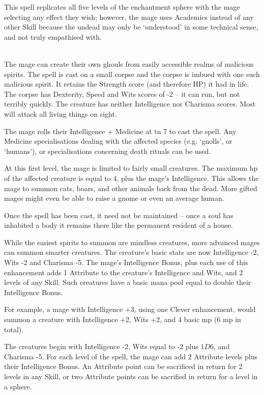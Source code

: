 \documentclass[titlepage,a4paper,openany]{book}
\begin{document}
\begin{multicols}{2}
This spell replicates all five levels of the enchantment sphere with the mage selecting any effect they wish; however, the mage uses Academics instead of any other Skill because the undead may only be `understood' in some technical sense, and not truly empathised with.

\\
The mage can create their own ghouls from easily accessible realms of malicious spirits. The spell is cast on a small corpse and the corpse is imbued with one such malicious spirit. It retains the Strength score (and therefore HP) it had in life.
The corpse has Dexterity, Speed and Wits scores of -2 -- it can run, but not terribly quickly.
The creature has neither Intelligence nor Charisma scores. Most will attack all living things on sight.

The mage rolls their Intelligence + Medicine at \gls{tn} 7 to cast the spell. Any Medicine specialisations dealing with the affected species (e.g. `gnolls', or `humans'), or specialisations concerning death rituals can be used.

At this first level, the mage is limited to fairly small creatures.  The maximum \gls{hp} of the affected creature is equal to 4, plus the mage's Intelligence.  This allows the mage to summon cats, boars, and other animals back from the dead.  More gifted mages might even be able to raise a gnome or even an average human.

Once the spell has been cast, it need not be maintained -- once a soul has inhabited a body it remains there like the permanent resident of a house.


While the easiest spirits to summon are mindless creatures, more advanced mages can summon smarter creatures.  The creature's basic stats are now Intelligence -2, Wits -2 and Charisma -5.  The mage's Intelligence Bonus, plus each use of this enhancement adds 1 Attribute to the creature's Intelligence and Wits, and 2 levels of any Skill.  Such creatures have a basic mana pool equal to double their Intelligence Bonus.  

For example, a mage with Intelligence +3, using one Clever enhancement, would summon a creature with Intelligence +2, Wits +2, and 4 basic \gls{mp} (6 \gls{mp} in total).

The creatures begin with Intelligence -2, Wits equal to -2 plus $1D6$, and Charisma -5.  For each level of the spell, the mage can add 2 Attribute levels plus their Intelligence Bonus.  An Attribute point can be sacrificed in return for 2 levels in any Skill, or two Attribute points can be sacrified in return for a level in a sphere.


\end{multicols}
\end{document}
